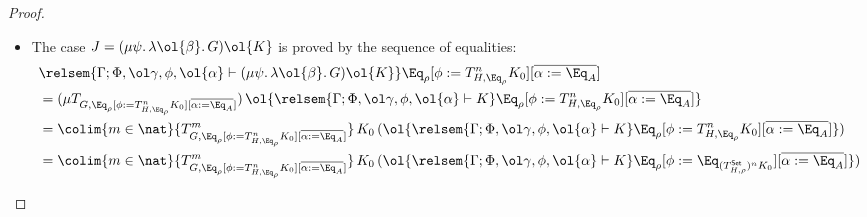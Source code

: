 \documentclass[acmsmall,review,anonymous]{acmart}
\theoremstyle{definition}
\newcommand{\set}{\mathsf{Set}}
\begin{document}
\begin{proof}
\begin{itemize}
\begin{itemize}
\item 
  The case $J = (\mu \psi.\, \lambda \ol{\beta}.\, G) \ol{K}$
is proved by the sequence of equalities:
\[
\begin{split}
& \relsem{\Gamma; \Phi, \ol\gamma, \phi, \ol{\alpha} \vdash (\mu \psi.\, \lambda \ol{\beta}.\, G) \ol{K}}
  \Eq_{\rho} [\phi := T^{n}_{H,\Eq_{\rho}} K_0]
  [\overline{\alpha := \Eq_A}] \\
&= (\mu {T_{G, \Eq_{\rho}[\phi := T^{n}_{H,\Eq_{\rho}} K_0][\overline{\alpha := \Eq_A}]}})
  \,\ol{\relsem{\Gamma; \Phi, \ol\gamma, \phi, \ol{\alpha} \vdash K}\Eq_{\rho}
  [\phi := T^{n}_{H,\Eq_{\rho}} K_0][\overline{\alpha := \Eq_A}]} \\ 
&= \colim{m \in \nat} {T^m_{G, \Eq_{\rho}[\phi := T^{n}_{H,\Eq_{\rho}} K_0][\overline{\alpha := \Eq_A}]}}\,K_0
  \,(\ol{\relsem{\Gamma; \Phi, \ol\gamma, \phi, \ol{\alpha} \vdash K}\Eq_{\rho}
  [\phi := T^{n}_{H,\Eq_{\rho}} K_0][\overline{\alpha := \Eq_A}]}) \\ 
&= \colim{m \in \nat} {T^m_{G, \Eq_{\rho}[\phi := T^{n}_{H,\Eq_{\rho}} K_0][\overline{\alpha := \Eq_A}]}}\,K_0
  \,(\ol{\relsem{\Gamma; \Phi, \ol\gamma, \phi, \ol{\alpha} \vdash K}\Eq_{\rho}
  [\phi := \Eq_{(T^{\set}_{H,\rho})^n K_0}][\overline{\alpha := \Eq_A}]}) \\  %

\end{split}\]
\end{itemize}
\end{itemize}
\end{proof}
\end{document}
